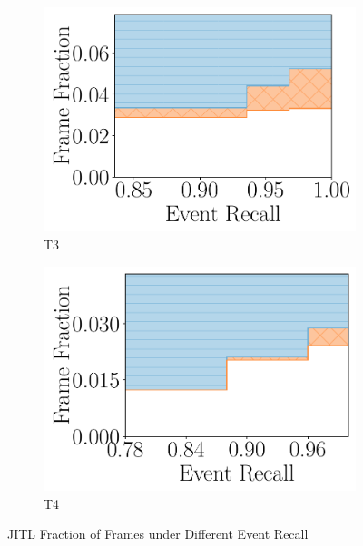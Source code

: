 \begin{figure}
    \vspace{.5in}

    \begin{subfigure}[b]{.48\linewidth}
        \centering
        \includegraphics[width=\linewidth]{FIGS/fig-jitl-raft-eventrecall-step.pdf}
        \caption{T3}
    \end{subfigure}
    \begin{subfigure}[b]{.48\linewidth}
        \centering
        \includegraphics[width=\linewidth]{FIGS/fig-jitl-elephant-eventrecall-step.pdf}
        \caption{T4}
    \end{subfigure}

    \vspace{.5in}
    \caption{JITL Fraction of Frames under Different Event Recall}
    \label{fig:jitl-eventrecall}
\end{figure}


